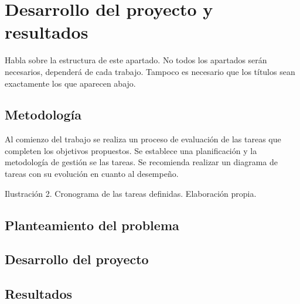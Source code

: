 
\section{Desarrollo del proyecto y resultados}

Habla sobre la estructura de este apartado. No todos los apartados serán necesarios, dependerá de cada trabajo. Tampoco es necesario que los títulos sean exactamente los que aparecen abajo.

\subsection{Metodología}

Al comienzo del trabajo se realiza un proceso de evaluación de las tareas que completen los objetivos propuestos. Se establece una planificación y la metodología de gestión se las tareas. Se recomienda realizar un diagrama de tareas con su evolución en cuanto al desempeño.

\vspace{1.0\baselineskip}
\begin{center}
Ilustración 2. Cronograma de las tareas definidas. Elaboración propia.
\end{center}
\vspace{1.0\baselineskip}

\subsection{Planteamiento del problema}

\subsection{Desarrollo del proyecto}

\subsection{Resultados}
